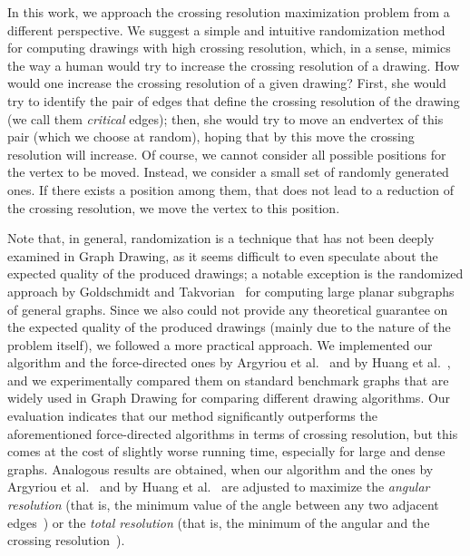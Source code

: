 \documentclass{comjnl}
\begin{document}
In this work, we approach the crossing resolution maximization problem from a different perspective. We suggest a simple and intuitive randomization method for computing drawings with high crossing resolution, which, in a sense, mimics the way a human would try to increase the crossing resolution of a drawing. How would one increase the crossing resolution of a given drawing? First, she would try to identify the pair of edges that define the crossing resolution of the drawing (we call them \emph{critical} edges); then, she would try to move an endvertex of this pair (which we choose at random), hoping that by this move the crossing resolution will increase. Of course, we cannot consider all possible positions for the vertex to be moved. Instead, we consider a small set of randomly generated ones. If there exists a position among them, that does not lead to a reduction of the crossing resolution, we move the vertex to this position.

Note that, in general, randomization is a technique that has not been deeply examined in Graph Drawing, as it seems difficult to even speculate about the expected quality of the produced drawings; a notable exception is the randomized approach by Goldschmidt and Takvorian~\cite{DBLP:journals/networks/GoldschmidtT94} for computing large planar subgraphs of general graphs. Since we also could not provide any theoretical guarantee on the expected quality of the produced drawings (mainly due to the nature of the problem itself), we followed a more practical approach. We implemented our algorithm and the force-directed ones by Argyriou et al.~\cite{DBLP:journals/cj/ArgyriouBS13} and by Huang et al.~\cite{DBLP:journals/vlc/HuangEHL13}, and we experimentally compared them on standard benchmark graphs that are widely used in Graph Drawing for comparing different drawing algorithms. Our evaluation indicates that our method significantly outperforms the aforementioned force-directed algorithms in terms of crossing resolution, but this comes at the cost of slightly worse running time, especially for large and dense graphs. Analogous results are obtained, when our algorithm and the ones by Argyriou et al.~\cite{DBLP:journals/cj/ArgyriouBS13} and by Huang et al.~\cite{DBLP:journals/vlc/HuangEHL13} are adjusted to maximize the \emph{angular resolution} (that is, the minimum value of the angle between any two adjacent edges~\cite{DBLP:journals/siamcomp/FormannHHKLSWW93}) or the \emph{total resolution} (that is, the minimum of the angular and the crossing resolution~\cite{DBLP:journals/cj/ArgyriouBS13}).
\end{document}
